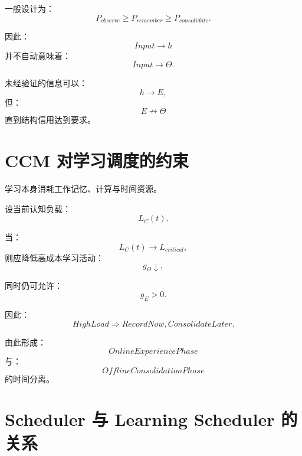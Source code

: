 一般设计为：
\begin{equation}
\boxed{
P_{observe}
\geq
P_{remember}
\geq
P_{consolidate}.
}
\end{equation}

因此：
\begin{equation}
Input
\rightarrow
h
\end{equation}
并不自动意味着：
\begin{equation}
Input
\rightarrow
\Theta.
\end{equation}

未经验证的信息可以：
\begin{equation}
h\rightarrow E,
\end{equation}
但：
\begin{equation}
E\nrightarrow\Theta
\end{equation}
直到结构信用达到要求。


\section{CCM 对学习调度的约束}

学习本身消耗工作记忆、计算与时间资源。

设当前认知负载：
\begin{equation}
L_C(t).
\end{equation}

当：
\begin{equation}
L_C(t)
\rightarrow
L_{critical},
\end{equation}
则应降低高成本学习活动：
\begin{equation}
g_\Theta\downarrow,
\end{equation}

同时仍可允许：
\begin{equation}
g_E>0.
\end{equation}

因此：
\begin{equation}
\boxed{
HighLoad
\Rightarrow
RecordNow,
ConsolidateLater.
}
\end{equation}

由此形成：
\begin{equation}
OnlineExperiencePhase
\end{equation}
与：
\begin{equation}
OfflineConsolidationPhase
\end{equation}
的时间分离。


\section{Scheduler 与 Learning Scheduler 的关系}

